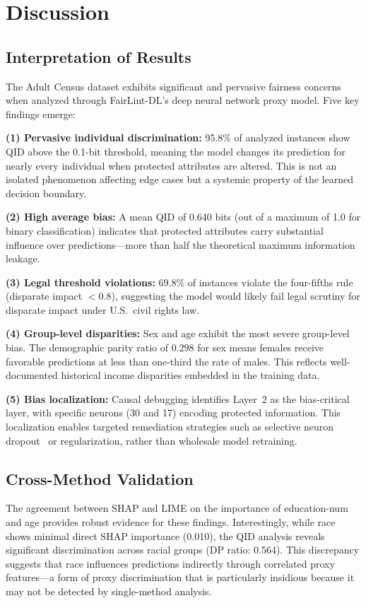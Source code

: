 \chapter{Discussion}
\label{ch:discussion}

\section{Interpretation of Results}

The Adult Census dataset exhibits significant and pervasive fairness concerns when analyzed through FairLint-DL's deep neural network proxy model. Five key findings emerge:

\textbf{(1) Pervasive individual discrimination:} 95.8\% of analyzed instances show QID above the 0.1-bit threshold, meaning the model changes its prediction for nearly every individual when protected attributes are altered. This is not an isolated phenomenon affecting edge cases but a systemic property of the learned decision boundary.

\textbf{(2) High average bias:} A mean QID of 0.640 bits (out of a maximum of 1.0 for binary classification) indicates that protected attributes carry substantial influence over predictions---more than half the theoretical maximum information leakage.

\textbf{(3) Legal threshold violations:} 69.8\% of instances violate the four-fifths rule (disparate impact $< 0.8$), suggesting the model would likely fail legal scrutiny for disparate impact under U.S.\ civil rights law.

\textbf{(4) Group-level disparities:} Sex and age exhibit the most severe group-level bias. The demographic parity ratio of 0.298 for sex means females receive favorable predictions at less than one-third the rate of males. This reflects well-documented historical income disparities embedded in the training data.

\textbf{(5) Bias localization:} Causal debugging identifies Layer~2 as the bias-critical layer, with specific neurons (30 and 17) encoding protected information. This localization enables targeted remediation strategies such as selective neuron dropout~\cite{neufair} or regularization, rather than wholesale model retraining.

\section{Cross-Method Validation}

The agreement between SHAP and LIME on the importance of education-num and age provides robust evidence for these findings. Interestingly, while race shows minimal direct SHAP importance (0.010), the QID analysis reveals significant discrimination across racial groups (DP ratio: 0.564). This discrepancy suggests that race influences predictions indirectly through correlated proxy features---a form of proxy discrimination that is particularly insidious because it may not be detected by single-method analysis.


